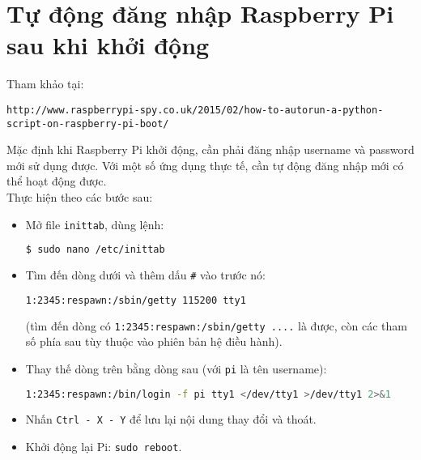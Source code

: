\chapter{Tự động đăng nhập Raspberry Pi sau khi khởi động}
\label{Sub:auto-login}
Tham khảo tại:

\begin{footnotesize}
\verb|http://www.raspberrypi-spy.co.uk/2015/02/how-to-autorun-a-python-script-on-raspberry-pi-boot/|
\end{footnotesize}

Mặc định khi Raspberry Pi khởi động, cần phải đăng nhập username và password mới sử dụng được. Với một số ứng dụng thực tế, cần tự động đăng nhập mới có thể hoạt động được.\\

Thực hiện theo các bước sau:
\begin{itemize}
\item Mở file \verb|inittab|, dùng lệnh:
\begin{lstlisting}[language=bash]
$ sudo nano /etc/inittab
\end{lstlisting}
\item Tìm đến dòng dưới và thêm dấu \verb|#| vào trước nó:
\begin{lstlisting}[language=bash]
1:2345:respawn:/sbin/getty 115200 tty1
\end{lstlisting}
(tìm đến dòng có \verb|1:2345:respawn:/sbin/getty ....| là được, còn các tham số phía sau tùy thuộc vào phiên bản hệ điều hành).
\item Thay thế dòng trên bằng dòng sau (với \verb|pi| là tên username):
\begin{lstlisting}[language=bash]
1:2345:respawn:/bin/login -f pi tty1 </dev/tty1 >/dev/tty1 2>&1
\end{lstlisting}
\item Nhấn \verb|Ctrl - X - Y| để lưu lại nội dung thay đổi và thoát.
\item Khởi động lại Pi: \verb|sudo reboot|.
\end{itemize}